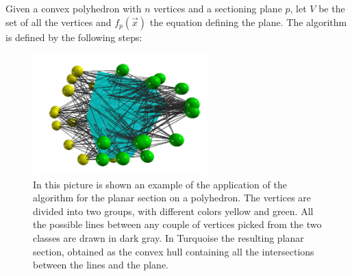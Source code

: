     Given a convex polyhedron with $n$ vertices and a sectioning plane $p$, let $V$ be the set of all the vertices and $f_p(\vec x)$ the equation defining the plane. The algorithm is defined by the following steps:

    \begin{figure}
        \centering
        \includegraphics[width = 0.6\textwidth]{images/sec_pol}
        \caption{In this picture is shown an example of the application of the algorithm for the planar section on a polyhedron. The vertices are divided into two groups, with different colors yellow and green. All the possible lines between any couple of vertices picked from the two classes are drawn in dark gray. In Turquoise the resulting planar section, obtained as the convex hull containing all the intersections between the lines and the plane.}
        \label{fig:sec_pol}
    \end{figure}

